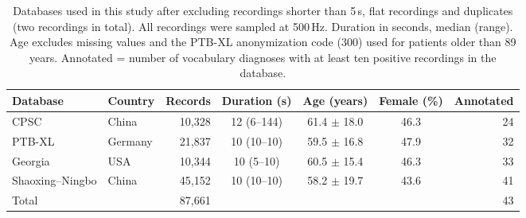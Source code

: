 \begin{table}[t]\centering\footnotesize\setlength{\tabcolsep}{4pt}
\caption{Databases used in this study after excluding recordings shorter than 5\,s, flat recordings and duplicates (two recordings in total). All recordings were sampled at 500\,Hz. Duration in seconds, median (range). Age excludes missing values and the PTB-XL anonymization code (300) used for patients older than 89 years. Annotated = number of vocabulary diagnoses with at least ten positive recordings in the database.}\label{tab:datasets}
\begin{tabular*}{\textwidth}{@{\extracolsep{\fill}}llrcccr@{}}\toprule
Database & Country & Records & Duration (s) & Age (years) & Female (\%) & Annotated \\ \midrule
CPSC & China & 10,328 & 12 (6--144) & 61.4 $\pm$ 18.0 & 46.3 & 24 \\
PTB-XL & Germany & 21,837 & 10 (10--10) & 59.5 $\pm$ 16.8 & 47.9 & 32 \\
Georgia & USA & 10,344 & 10 (5--10) & 60.5 $\pm$ 15.4 & 46.3 & 33 \\
Shaoxing--Ningbo & China & 45,152 & 10 (10--10) & 58.2 $\pm$ 19.7 & 43.6 & 41 \\
\midrule Total & & 87,661 & & & & 43 \\
\bottomrule\end{tabular*}\end{table}
